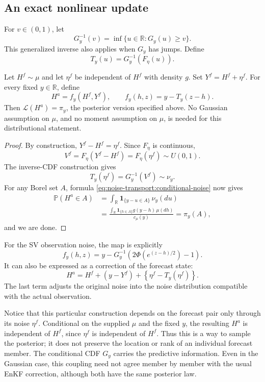\subsection{An exact nonlinear update}

For $v\in(0,1)$, let
\[
G_y^{-1}(v)=\inf\{u\in\mathbb R:G_y(u)\ge v\}.
\]
This generalized inverse also applies when $G_y$ has jumps. Define
\begin{equation}
T_y(u)=G_y^{-1}(F_\eta(u)).
\label{eq:noise-transport:noise-map}
\end{equation}

\begin{theorem}
Let $H^f\sim\mu$ and let $\eta^f$ be independent of $H^f$ with density $g$.
Set $Y^f=H^f+\eta^f$. For every fixed $y\in\mathbb R$, define
\begin{equation}
H^a=f_y(H^f,Y^f),\qquad
f_y(h,z)=y-T_y(z-h).
\label{eq:noise-transport:update}
\end{equation}
Then $\mathcal L(H^a)=\pi_y$, the posterior version specified above.
No Gaussian assumption on $\mu$, and no moment assumption on $\mu$,
is needed for this distributional statement.
\end{theorem}

\begin{proof}
By construction, $Y^f-H^f=\eta^f$. Since $F_\eta$ is continuous,
\[
V^f=F_\eta(Y^f-H^f)=F_\eta(\eta^f)\sim U(0,1).
\]
The inverse-CDF construction gives
\[
T_y(\eta^f)=G_y^{-1}(V^f)\sim\nu_y.
\]
For any Borel set $A$, formula \eqref{eq:noise-transport:conditional-noise} now gives
\begin{align*}
\mathbb P(H^a\in A)
&=\int_\mathbb R\mathbf 1_{\{y-u\in A\}}\,\nu_y(du)\\
&=\frac{\int_\mathbb R
\mathbf 1_{\{h\in A\}}g(y-h)\,\mu(dh)}{c_\mu(y)}
=\pi_y(A),
\end{align*}
and we are done.
\end{proof}

For the SV observation noise, the map is explicitly
\[
f_y(h,z)
=y-G_y^{-1}\left(2\Phi(e^{(z-h)/2})-1\right).
\]
It can also be expressed as a correction of the forecast state:
\[
H^a
=H^f+(y-Y^f)
+\left\{\eta^f-T_y(\eta^f)\right\}.
\]
The last term adjusts the original noise into the noise distribution
compatible with the actual observation.

Notice that this particular construction depends on the forecast pair
only through its noise $\eta^f$. Conditional on the supplied $\mu$ and
the fixed $y$, the resulting $H^a$ is independent of $H^f$, since $\eta^f$
is independent of $H^f$. Thus this is a way to sample the posterior;
it does not preserve the location or rank of an individual forecast member.
The conditional CDF $G_y$ carries the predictive information. Even in
the Gaussian case, this coupling need not agree member by member with
the usual EnKF correction, although both have the same posterior law.

